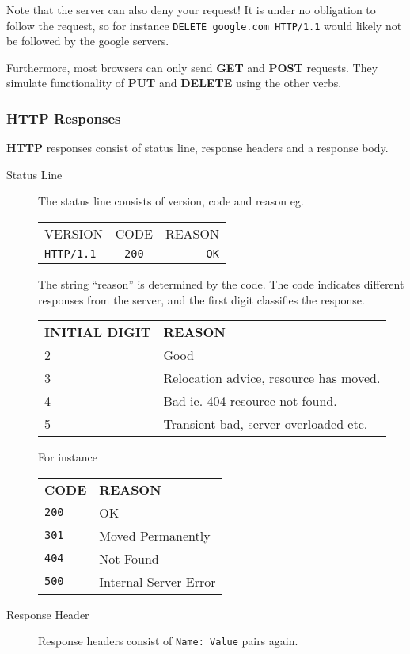 \documentclass[11pt]{article}
\begin{document}
Note that the server can also deny your request! It is under no obligation to follow the request, so for instance \texttt{DELETE google.com HTTP/1.1} would likely not be followed by the google servers.

Furthermore, most browsers can only send \textbf{GET} and \textbf{POST} requests. They simulate functionality of \textbf{PUT} and \textbf{DELETE} using the other verbs.

\subsubsection{HTTP Responses}

\textbf{HTTP} responses consist of status line, response headers and a response body.
\begin{description}
\item[Status Line]
The status line consists of version, code and reason
eg. 

\begin{tabular}{ l c r }
  VERSION & CODE & REASON \\
  \texttt{HTTP/1.1} & \texttt{200} & \texttt{OK} \\
\end{tabular}
The string ``reason'' is determined by the code. The code indicates different responses from the server, and the first digit classifies the response.

\begin{tabular}{ l l }
  \textbf{INITIAL DIGIT} & \textbf{REASON} \\
  2 & Good \\
  3 & Relocation advice, resource has moved. \\
  4 & Bad ie. 404 resource not found. \\
  5 & Transient bad, server overloaded etc. \\
\end{tabular}

For instance

\begin{tabular}{ l l }
  \textbf{CODE} & \textbf{REASON} \\
  \texttt{200} & OK  \\
  \texttt{301} & Moved Permanently  \\
  \texttt{404} & Not Found  \\
  \texttt{500} & Internal Server Error  \\
\end{tabular}
\item[Response Header]
Response headers consist of \texttt{Name: Value} pairs again.


\end{description}
\end{document}

